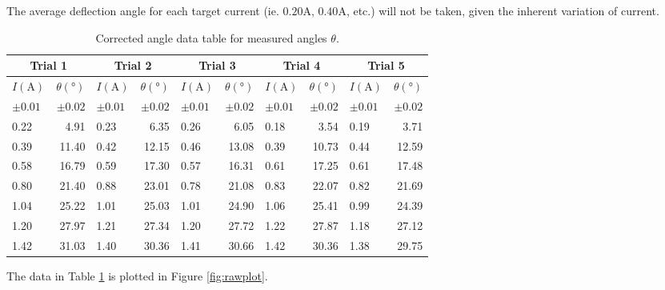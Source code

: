 The average deflection angle for each target current (ie. $0.20\si{\ampere}$, $0.40\si{\ampere}$, etc.) will not be taken, given the inherent variation of current. %

\begin{table}[H]
	\centering
	\begin{tabular}{|lr||lr||lr||lr||lr|}
		\hline
		\multicolumn{2}{|c||}{Trial 1} & \multicolumn{2}{|c||}{Trial 2} & \multicolumn{2}{c||}{Trial 3}& \multicolumn{2}{c||}{Trial 4}& \multicolumn{2}{c|}{Trial 5} \\
		\hline
		$I(\si{\ampere})$ & $\theta(\si{\degree})$ & $I(\si{\ampere})$ & $\theta(\si{\degree})$ & $I(\si{\ampere})$ & $\theta(\si{\degree})$ & $I(\si{\ampere})$ & $\theta(\si{\degree})$ & $I(\si{\ampere})$ & $\theta(\si{\degree})$ \\
		$\pm0.01$ & $\pm0.02$ & $\pm0.01$ & $\pm0.02$ & $\pm0.01$ & $\pm0.02$ & $\pm0.01$ & $\pm0.02$ & $\pm0.01$ & $\pm0.02$ \\
		\hline
		0.22 & 4.91 & 0.23 & 6.35 & 0.26 & 6.05 & 0.18 & 3.54 & 0.19 & 3.71 \\
		0.39 & 11.40 & 0.42 & 12.15 & 0.46 & 13.08 & 0.39 & 10.73 & 0.44 & 12.59 \\
		0.58 & 16.79 & 0.59 & 17.30 & 0.57 & 16.31 & 0.61 & 17.25 & 0.61 & 17.48 \\
		0.80 & 21.40 & 0.88 & 23.01 & 0.78 & 21.08 & 0.83 & 22.07 & 0.82 & 21.69 \\
		1.04 & 25.22 & 1.01 & 25.03 & 1.01 & 24.90 & 1.06 & 25.41 & 0.99 & 24.39 \\
		1.20 & 27.97 & 1.21 & 27.34 & 1.20 & 27.72 & 1.22 & 27.87 & 1.18 & 27.12 \\
		1.42 & 31.03 & 1.40 & 30.36 & 1.41 & 30.66 & 1.42 & 30.36 & 1.38 & 29.75 \\
		\hline
	\end{tabular}
	\caption{Corrected angle data table for measured angles $\theta$.}
	\vspace{-10pt}
	\label{tab:raw2}
\end{table}

The data in Table \ref{tab:raw2} is plotted in Figure \ref{fig:rawplot}.

